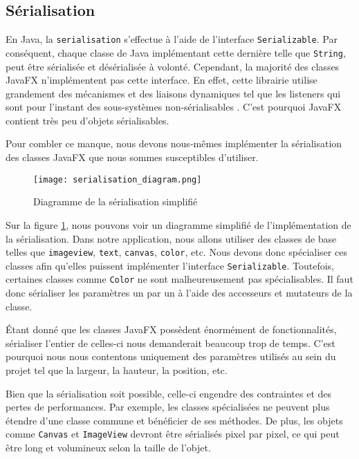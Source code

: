 \subsection{Sérialisation}
\label{sec:serialisation}

En Java, la \texttt{\gls{serialisation}} s'effectue à l'aide de l'interface \texttt{Serializable}. Par conséquent, chaque classe de Java implémentant cette dernière telle que \texttt{String}, peut être sérialisée et désérialisée à volonté. Cependant, la majorité des classes JavaFX n'implémentent pas cette interface. En effet, cette librairie utilise grandement des mécanismes et des liaisons dynamiques tel que les listeners qui sont pour l'instant des sous-systèmes non-sérialisables \cite{javadoc_scene_graphe}.  C'est pourquoi JavaFX contient très peu d'objets sérialisables.

Pour combler ce manque, nous devons nous-mêmes implémenter la sérialisation des classes JavaFX que nous sommes susceptibles d'utiliser.

\begin{figure}[!ht]
    \caption{Diagramme de la sérialisation simplifié}
    \centering
    \texttt{[image: serialisation\_diagram.png]}
    \label{fig:seri_diag}
\end{figure}

Sur la figure \ref{fig:seri_diag}, nous pouvons voir un diagramme simplifié de l'implémentation de la sérialisation. Dans notre application, nous allons utiliser des classes de base telles que \texttt{\gls{imageview}}, \texttt{\gls{text}}, \texttt{\gls{canvas}}, \texttt{\gls{color}}, etc. Nous devons donc spécialiser ces classes afin qu'elles puissent implémenter l'interface \texttt{Serializable}. Toutefois, certaines classes comme \texttt{Color} ne sont malheureusement pas spécialisables. Il faut donc sérialiser les paramètres un par un à l'aide des accesseurs et mutateurs de la classe.

Étant donné que les classes JavaFX possèdent énormément de fonctionnalités, sérialiser l'entier de celles-ci nous demanderait beaucoup trop de temps. C'est pourquoi nous nous contentons uniquement des paramètres utilisés au sein du projet tel que la largeur, la hauteur, la position, etc.

\newpage


Bien que la sérialisation soit possible, celle-ci engendre des contraintes et des pertes de performances. Par exemple, les classes spécialisées ne peuvent plus étendre d'une classe commune et bénéficier de ses méthodes. De plus, les objets comme \texttt{Canvas} et \texttt{ImageView} devront être sérialisés pixel par pixel, ce qui peut être long et volumineux selon la taille de l'objet.


